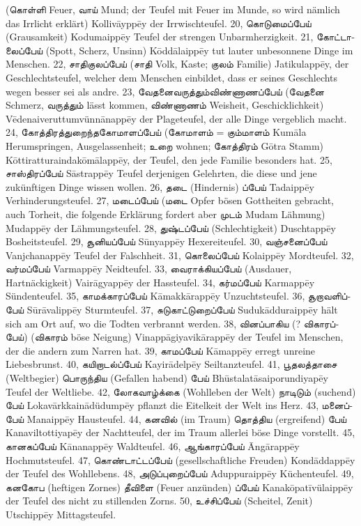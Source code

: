 \documentclass{article}
\newcommand{\TamilText}[1]{\texttamil{#1}}
\newcommand{\tam}[1]{\TamilText{#1}}
\begin{document}
(\tam{கொள்ளி} Feuer, \tam{வாய்} Mund; der Teufel mit Feuer im Munde, so wird nämlich das Irrlicht erklärt) Kolliv\={a}ypp\={e}y der Irrwischteufel. 20, \tam{கொடுமைப்பேய்} (Grausamkeit) Kodumaipp\={e}y Teufel der strengen Unbarmherzigkeit. 21, \tam{கோட்டாலைப்பேய்} (Spott, Scherz, Unsinn) K\={o}dd\={a}laipp\={e}y tut lauter unbesonnene Dinge im Menschen. 22, \tam{சாதிகுலப்பேய்} (\tam{சாதி} Volk, Kaste; \tam{குலம்} Familie) Jatikulapp\={e}y, der Geschlechtsteufel, welcher dem Menschen einbildet, dass er seines Geschlechts wegen besser sei als andre. 23, \tam{வேதனைவருத்தும்விண்ணாணப்பேய்} (\tam{வேதனை} Schmerz, \tam{வருத்தும்} lässt kommen, \tam{விண்ணாணம்} Weisheit, Geschicklichkeit) V\={e}denaiveruttumvünn\={a}napp\={e}y der Plageteufel, der alle Dinge vergeblich macht. 24, \tam{கோத்திரத்துறைந்தகோமாளப்பேய்} (\tam{கோமாளம்} = \tam{கும்மாளம்} Kum\={a}la Herumspringen, Ausgelassenheit; \tam{உறை} wohnen; \tam{கோத்திரம்} G\={o}tra Stamm) K\={o}ttiratturaindak\={o}m\={a}lapp\={e}y, der Teufel, den jede Familie besonders hat. 25, \tam{சாஸ்திரப்பேய்} S\={a}strapp\={e}y Teufel derjenigen Gelehrten, die diese und jene zukünftigen Dinge wissen wollen. 26, \tam{தடை} (Hindernis) \tam{ப்பேய்} Tadaipp\={e}y Verhinderungsteufel. 27, \tam{மடைப்பேய்} (\tam{மடை} Opfer bösen Gottheiten gebracht, auch Torheit, die folgende Erklärung fordert aber \tam{முடம்} Mudam Lähmung) Mudapp\={e}y der Lähmungsteufel. 28, \tam{துஷ்டப்பேய்} (Schlechtigkeit) Duschtapp\={e}y Bosheitsteufel. 29, \tam{சூனியப்பேய்} S\={u}nyapp\={e}y Hexereiteufel. 30, \tam{வஞ்சனைப்பேய்} Vanjchanapp\={e}y Teufel der Falschheit. 31, \tam{கொலைப்பேய்} Kolaipp\={e}y Mordteufel. 32, \tam{வர்மப்பேய்} Varmapp\={e}y Neidteufel. 33, \tam{வைராக்கியப்பேய்} (Ausdauer, Hartnäckigkeit) Vair\={a}gyapp\={e}y der Hassteufel. 34, \tam{கர்மப்பேய்} Karmapp\={e}y Sündenteufel. 35, \tam{காமக்காரப்பேய்} K\={a}makk\={a}rapp\={e}y Unzuchtsteufel. 36, \tam{சூறாவளிப்பேய்} S\={u}r\={a}valipp\={e}y Sturmteufel. 37, \tam{சுடுகாட்டுறைப்பேய்} Suduk\={a}dduraipp\={e}y hält sich am Ort auf, wo die Todten verbrannt werden. 38, \tam{வினப்பாகிய} (? \tam{விகாரப்பேய்}) (\tam{விகாரம்} böse Neigung) Vinapp\={a}giyavik\={a}rapp\={e}y der Teufel im Menschen, der die andern zum Narren hat. 39, \tam{காமப்பேய்} K\={a}mapp\={e}y erregt unreine Liebesbrunst. 40, \tam{கயிறாடல்ப்பேய்} Kayir\={a}delp\={e}y Seiltanzteufel. 41, \tam{பூதலத்தாசை} (Weltbegier) \tam{பொருந்திய} (Gefallen habend) \tam{பேய்} Bh\={u}stalat\={a}saiporundiyap\={e}y Teufel der Weltliebe. 42, \tam{லோகவாழ்க்கை} (Wohlleben der Welt) \tam{நாடிடும்} (suchend) \tam{பேய்} Lokav\={a}rkkain\={a}düdump\={e}y pflanzt die Eitelkeit der Welt ins Herz. 43, \tam{மனைப்பேய்} Manaipp\={e}y Hausteufel. 44, \tam{கனவில்} (im Traum) \tam{தொத்திய} (ergreifend) \tam{பேய்} Kanaviltottiyap\={e}y der Nachtteufel, der im Traum allerlei böse Dinge vorstellt. 45, \tam{கானகப்பேய்} K\={a}nanapp\={e}y Waldteufel. 46, \tam{ஆங்காரப்பேய்} \={A}ng\={a}rapp\={e}y Hochmutsteufel. 47, \tam{கொண்டாட்டப்பேய்} (gesellschaftliche Freuden) Kond\={a}ddapp\={e}y der Teufel des Wohllebens. 48, \tam{அடுப்புறைப்பேய்} Aduppuraipp\={e}y Küchenteufel. 49, \tam{கனகோப} (heftigen Zornes) \tam{தீவிளை} (Feuer anzünden) \tam{ப்பேய்} Kanak\={o}pat\={i}vülaipp\={e}y der Teufel des nicht zu stillenden Zorns. 50, \tam{உச்சிப்பேய்} (Scheitel, Zenit) Utschipp\={e}y Mittagsteufel. 
\end{document}
